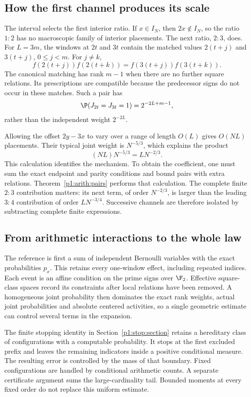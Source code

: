 \subsection{How the first channel produces its scale}
\label{p1:intro:mechanism}

The interval selects the first interior ratio. If \(x\in I_N\),
then \(2x\notin I_N\), so the ratio \(1:2\) has no macroscopic
family of interior placements. The next ratio, \(2:3\), does.
For \(L=3m\), the windows at \(2t\) and \(3t\) contain the matched
values \(2(t+j)\) and \(3(t+j)\), \(0\le j<m\). For \(j\ne k\),
\[
 f(2(t+j))f(2(t+k))=f(3(t+j))f(3(t+k)).
\]
The canonical matching has rank \(m-1\) when there are no further
square relations. Its prescriptions are compatible because the
predecessor signs do not occur in these matches. Such a pair has
\[
 \P(J_{2t}=J_{3t}=1)=2^{-2L+m-1},
\]
rather than the independent weight \(2^{-2L}\).

Allowing the offset \(2y-3x\) to vary over a range of length
\(O(L)\) gives \(O(NL)\) placements. Their typical joint weight is
\(N^{-5/3}\), which explains the product
\[
             (NL)N^{-5/3}=LN^{-2/3}.
\]
This calculation identifies the mechanism. To obtain the coefficient,
one must sum the exact endpoint and parity conditions and bound pairs
with extra relations. Theorem~\ref{p1:arith:pairs} performs that
calculation. The complete finite \(2:3\) contribution matters:
its next term, of order \(N^{-2/3}\), is larger than the leading
\(3:4\) contribution of order \(LN^{-3/4}\). Successive channels
are therefore isolated by subtracting complete finite expressions.

\subsection{From arithmetic interactions to the whole law}
\label{p1:intro:strategy}
\label{p1:intro:dependencies}

The reference is first a sum of independent Bernoulli variables with
the exact probabilities \(p_x\). This retains every one-window effect,
including repeated indices. Each event is an affine condition on the
prime signs over \(\F_2\). Effective square-class spaces record its
constraints after local relations have been removed. A homogeneous
joint probability then dominates the exact rank weights, actual joint
probabilities and absolute centered activities, so a single geometric
estimate can control several terms in the expansion.

The finite stopping identity in Section~\ref{p1:stop:section} retains
a hereditary class of configurations with a computable probability.
It stops at the first excluded prefix and leaves the remaining
indicators inside a positive conditional measure. The resulting error
is controlled by the mass of that boundary. Fixed configurations are
handled by conditional arithmetic counts. A separate certificate
argument sums the large-cardinality tail. Bounded moments at every
fixed order do not replace this uniform estimate.


